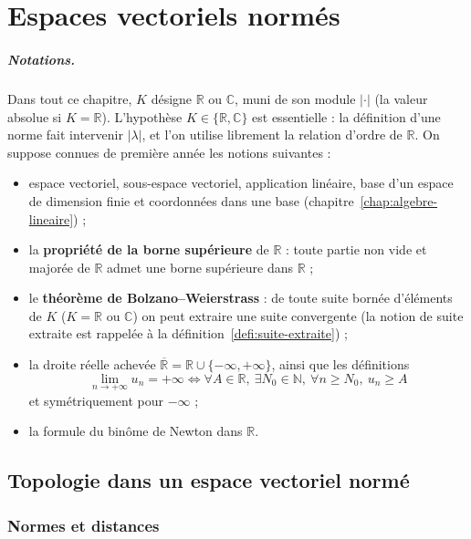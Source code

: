 \chapter{Espaces vectoriels normés}
\label{chap:evn}

\paragraph{Notations.} Dans tout ce chapitre, $K$ désigne $\mathbb{R}$ ou $\mathbb{C}$, muni de son module $|\cdot|$ (la valeur absolue si $K=\mathbb{R}$). L'hypothèse $K\in\{\mathbb{R},\mathbb{C}\}$ est essentielle : la définition d'une norme fait intervenir $|\lambda|$, et l'on utilise librement la relation d'ordre de $\mathbb{R}$. On suppose connues de première année les notions suivantes :
\begin{itemize}
\item espace vectoriel, sous-espace vectoriel, application linéaire, base d'un espace de dimension finie et coordonnées dans une base (chapitre~\ref{chap:algebre-lineaire}) ;
\item la \textbf{propriété de la borne supérieure} de $\mathbb{R}$ : toute partie non vide et majorée de $\mathbb{R}$ admet une borne supérieure dans $\mathbb{R}$ ;
\item le \textbf{théorème de Bolzano--Weierstrass} : de toute suite bornée d'éléments de $K$ ($K=\mathbb{R}$ ou $\mathbb{C}$) on peut extraire une suite convergente (la notion de suite extraite est rappelée à la définition~\ref{defi:suite-extraite}) ;
\item la droite réelle achevée $\overline{\mathbb{R}}=\mathbb{R}\cup\{-\infty,+\infty\}$, ainsi que les définitions
\[\lim_{n\to+\infty} u_n = +\infty \iff \forall A\in\mathbb{R},\ \exists N_0\in\mathbb{N},\ \forall n\geq N_0,\ u_n\geq A\]
et symétriquement pour $-\infty$ ;
\item la formule du binôme de Newton dans $\mathbb{R}$.
\end{itemize}

\section{Topologie dans un espace vectoriel normé}

\subsection{Normes et distances}

